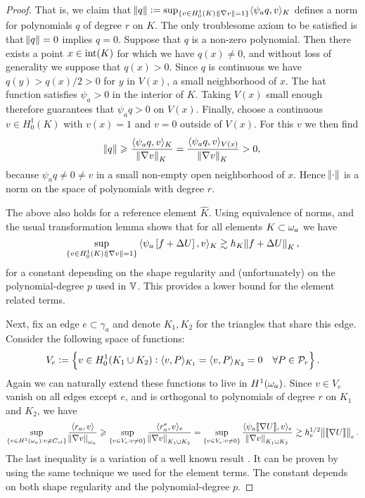 \documentclass[thesis.tex]{subfiles}
\begin{document}
\begin{proof}
  That is, we claim that $\norm{q} := \sup_{\{v \in H_0^1(K) : \norm{\nabla v}=1\}} \langle \psi_a q, v\rangle_K$
  defines a norm for polynomials $q$ of degree $r$ on $K$. The only troublesome axiom to be satisfied
  is that $\norm{q} = 0$  implies $q=0$. Suppose that $q$ is a non-zero polynomial.
  Then there exists a point $x \in \operatorname{int}(K)$ for which we have $q(x) \ne 0$, and without loss of generality we suppose that $q(x) > 0$.
  Since $q$ is continuous we have $q(y) > q(x) / 2 > 0$ for $y$ in $V(x)$, a small neighborhood of $x$.
  The hat function satisfies $\psi_a > 0$ in the interior of $K$. Taking $V(x)$ small enough therefore guarantees that $\psi_a q>0$ on $V(x)$.
  Finally, choose a continuous $v \in H_0^1(K)$  with $v(x) = 1$ and $v = 0$ outside of $V(x)$. For this $v$ we then find
  \[
    \norm{q} \geqslant { \langle  \psi_a q, v\rangle_K \over \norm{\nabla v}_K}  = {\langle \psi_a q, v\rangle_{V(x)} \over \norm{\nabla v}_K} > 0,
  \]
  because $\psi_a q \ne 0 \ne v$ in a small non-empty open neighborhood of $x$. Hence $\norm{\cdot}$ is a norm on the space of polynomials with degree $r$.
  
  The above also holds for a reference element $\hat K$. Using equivalence of norms, and the usual transformation lemma
  shows that for all elements $K \subset \omega_a$ we have
  \[
    \sup_{\{v \in H_0^1(K) :  \norm{\nabla v}=1\}} { \langle\psi_a\left[ f + \Delta U\right],v\rangle_K } \gtrsim h_K \norm{ f + \Delta U }_K,
  \]
  for a constant depending on the shape regularity and (unfortunately) on the polynomial-degree $p$ used in $\mathbb{V}$.  This
  provides a lower bound for the element related terms.
  
  
  Next, fix an edge $e \subset \gamma_a$ and denote $K_1, K_2$ for the triangles that share this edge. Consider the following space of functions:
  \[
  V_e := \set{v \in H_0^1(K_1 \cup K_2) :  \langle v,P \rangle_{K_1}=  \langle v,P \rangle_{K_2} = 0\quad \forall P \in \mathcal{P}_r}.\]
  Again we can naturally extend these functions to live in $H^1(\omega_a)$. Since $v \in V_e$ vanish on all edges except $e$, and
  is orthogonal to polynomials of degree $r$ on $K_1$ and $K_2$, we have
  \[
    \sup_{\{v \in H^1(\omega_a) : v \not \equiv C_{st}\}} { \langle r_a, v \rangle \over \norm{\nabla v}_{\omega_a}} 
    \geqslant \sup_{\{v \in V_e: v \ne 0\}} { \langle r^e_a, v \rangle_e \over \norm{\nabla v}_{K_1 \cup K_2}}
    = \sup_{\{v \in V_e: v \ne 0\}} { \langle \psi_a \llbracket \nabla U \rrbracket, v \rangle_e \over \norm{\nabla v}_{K_1 \cup K_2}}
          \gtrsim h_e^{1/2} \norm{\llbracket \nabla U \rrbracket}_e.
  \]
  The last inequality is a variation of a well known result \cite[Ex~9.x.7]{brenner}. It can be proven by using the same
  technique we used for the element terms. The constant depends on both shape regularity and the polynomial-degree $p$.


\end{proof}
\end{document}
